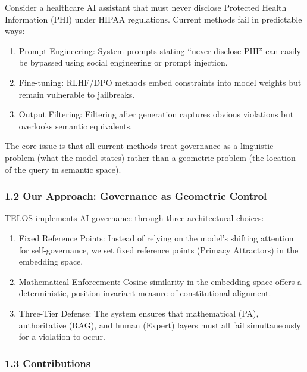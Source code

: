 Consider a healthcare AI assistant that must never disclose Protected
Health Information (PHI) under HIPAA regulations. Current methods fail
in predictable ways:

\begin{enumerate}
\def\labelenumi{\arabic{enumi}.}
\tightlist
\item
  Prompt Engineering: System prompts stating ``never disclose PHI'' can
  easily be bypassed using social engineering or prompt injection.
\item
  Fine-tuning: RLHF/DPO methods embed constraints into model weights but
  remain vulnerable to jailbreaks.
\item
  Output Filtering: Filtering after generation captures obvious
  violations but overlooks semantic equivalents.
\end{enumerate}

The core issue is that all current methods treat governance as a
linguistic problem (what the model states) rather than a geometric
problem (the location of the query in semantic space).

\subsubsection{1.2 Our Approach: Governance as Geometric
Control}\label{our-approach-governance-as-geometric-control}

TELOS implements AI governance through three architectural choices:

\begin{enumerate}
\def\labelenumi{\arabic{enumi}.}
\tightlist
\item
  Fixed Reference Points: Instead of relying on the model's shifting
  attention for self-governance, we set fixed reference points (Primacy
  Attractors) in the embedding space.
\item
  Mathematical Enforcement: Cosine similarity in the embedding space
  offers a deterministic, position-invariant measure of constitutional
  alignment.
\item
  Three-Tier Defense: The system ensures that mathematical (PA),
  authoritative (RAG), and human (Expert) layers must all fail
  simultaneously for a violation to occur.
\end{enumerate}

\subsubsection{1.3 Contributions}\label{contributions}

